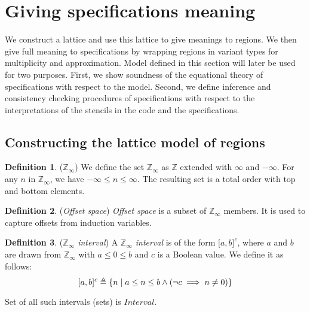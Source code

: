 \documentclass{article}
\theoremstyle{definition}
\newtheorem{defn}{Definition}
\theoremstyle{plain}
\theoremstyle{remark}
\newcommand{\zinf}{\textnormal{$\mathbb{Z}_\infty$}}
\newcommand{\interv}[3]{\textnormal{$\lbrack#1,#2\rbrack^{#3}$}}
\begin{document}
\section{Giving specifications meaning}

We construct a lattice and use this lattice to give meanings to regions. We
then give full meaning to specifications by wrapping regions in variant types
for multiplicity and approximation. Model defined in this section will later be
used for two purposes. First, we show soundness of the equational theory of
specifications with respect to the model. Second, we define inference and
consistency checking procedures of specifications with respect to the
interpretations of the stencils in the code and the specifications.

\subsection{Constructing the lattice model of regions}

\begin{defn}{(\zinf)}
  We define the set \zinf{} as $\mathbb{Z}$ extended with $\infty$ and
  $-\infty$. For any $n$ in \zinf{}, we have $-\infty \leq n \leq \infty$. The
  resulting set is a total order with top and bottom elements.
\end{defn}

\begin{defn}{(\emph{Offset space})}
  \emph{Offset space} is a subset of \zinf{} members. It is used to capture
  offsets from induction variables.

\end{defn}

\begin{defn}{(\emph{\zinf{} interval})}
  A \emph{\zinf{} interval} is of the form \interv{a}{b}{c}, where $a$ and $b$
  are drawn from \zinf{} with $a \leq 0 \leq b$ and $c$ is a Boolean value. We
  define it as follows:
%
  \begin{equation*}
    \interv{a}{b}{c} \triangleq
      \{ n \;|\; a \leq n \leq b \wedge (\neg c \implies n \neq 0) \}
  \end{equation*}

  Set of all such intervals (sets) is $\textit{Interval}$.
\end{defn}
\end{document}
